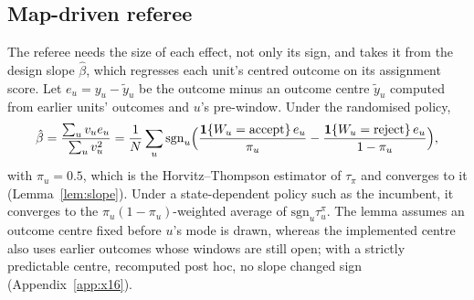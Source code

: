 \subsection{Map-driven referee}
\label{sec:acting}
\label{sec:slope}
\label{sec:referee}

The referee needs the size of each effect, not only its sign, and takes it from the design slope $\hat\beta$, which
regresses each unit's centred outcome on its assignment score. Let $e_u = y_u - \tilde y_u$ be the outcome minus an
outcome centre $\tilde y_u$ computed from earlier units' outcomes and $u$'s pre-window. Under the randomised policy,
\begin{equation}
\hat\beta = \frac{\sum_u v_u e_u}{\sum_u v_u^2}
          = \frac{1}{N} \sum_u \mathrm{sgn}_u \Bigl( \frac{\mathbf{1}\{W_u = \text{accept}\}\, e_u}{\pi_u}
            - \frac{\mathbf{1}\{W_u = \text{reject}\}\, e_u}{1 - \pi_u} \Bigr),
\label{eq:slope_ht}
\end{equation}
with $\pi_u = 0.5$, which is the Horvitz--Thompson estimator of $\tau_{\pi}$ and converges to it
(Lemma~\ref{lem:slope}). Under a state-dependent policy such as the incumbent, it converges to the
$\pi_u(1 - \pi_u)$-weighted average of $\mathrm{sgn}_u \tau_u^{\pi}$. The lemma assumes an outcome centre fixed before
$u$'s mode is drawn, whereas the implemented centre also uses earlier outcomes whose windows are still open; with a
strictly predictable centre, recomputed post hoc, no slope changed sign (Appendix~\ref{app:x16}).

